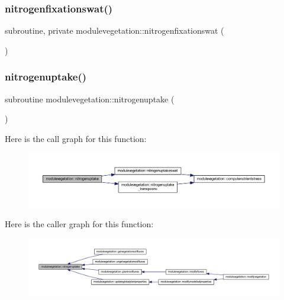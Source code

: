 \subsubsection{\texorpdfstring{nitrogenfixationswat()}{nitrogenfixationswat()}}
{\footnotesize\ttfamily subroutine, private modulevegetation\+::nitrogenfixationswat (\begin{DoxyParamCaption}{ }\end{DoxyParamCaption})\hspace{0.3cm}{\ttfamily [private]}}

\mbox{\label{namespacemodulevegetation_a61c5cc19d5b5fe894bc935b7365563cb}} 
\subsubsection{\texorpdfstring{nitrogenuptake()}{nitrogenuptake()}}
{\footnotesize\ttfamily subroutine modulevegetation\+::nitrogenuptake (\begin{DoxyParamCaption}{ }\end{DoxyParamCaption})\hspace{0.3cm}{\ttfamily [private]}}

Here is the call graph for this function\+:\nopagebreak
\begin{figure}[H]
\begin{center}
\leavevmode
\includegraphics[width=350pt]{namespacemodulevegetation_a61c5cc19d5b5fe894bc935b7365563cb_cgraph}
\end{center}
\end{figure}
Here is the caller graph for this function\+:\nopagebreak
\begin{figure}[H]
\begin{center}
\leavevmode
\includegraphics[width=350pt]{namespacemodulevegetation_a61c5cc19d5b5fe894bc935b7365563cb_icgraph}
\end{center}
\end{figure}
\mbox{\label{namespacemodulevegetation_a1a53d3932ef020aaa3e0656050c15ee3}} 
